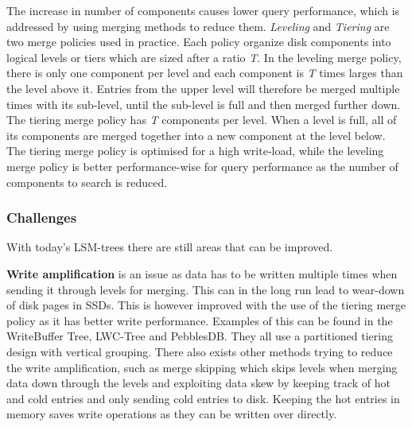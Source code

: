 The increase in number of components causes lower query performance, which is addressed by using merging methods to reduce them. \emph{Leveling} and \emph{Tiering} are two merge policies used in practice. Each policy organize disk components into logical levels or tiers which are sized after a ratio \emph{T}. In the leveling merge policy, there is only one component per level and each component is \emph{T} times larges than the level above it. Entries from the upper level will therefore be merged multiple times with its sub-level, until the sub-level is full and then merged further down. The tiering merge policy has \emph{T} components per level. When a level is full, all of its components are merged together into a new component at the level below. The tiering merge policy is optimised for a high write-load, while the leveling merge policy is better performance-wise for query performance as the number of components to search is reduced\cite{LSMSurvey}. 

\subsubsection{Challenges}
With today's LSM-trees there are still areas that can be improved. \newline

\noindent
\textbf{Write amplification} is an issue as data has to be written multiple times when sending it through levels for merging. This can in the long run lead to wear-down of disk pages in SSDs. This is however improved with the use of the tiering merge policy as it has better write performance. Examples of this can be found in the WriteBuffer Tree\cite{WBTree}, LWC-Tree\cite{LWCTree1}\cite{LWCTree2} and PebblesDB\cite{PebblesDB}. They all use a partitioned tiering design with vertical grouping. There also exists other methods trying to reduce the write amplification, such as merge skipping which skips levels when merging data down through the levels\cite{SkipTree} and exploiting data skew by keeping track of hot and cold entries and only sending cold entries to disk\cite{TRIAD}. Keeping the hot entries in memory saves write operations as they can be written over directly. \newline

